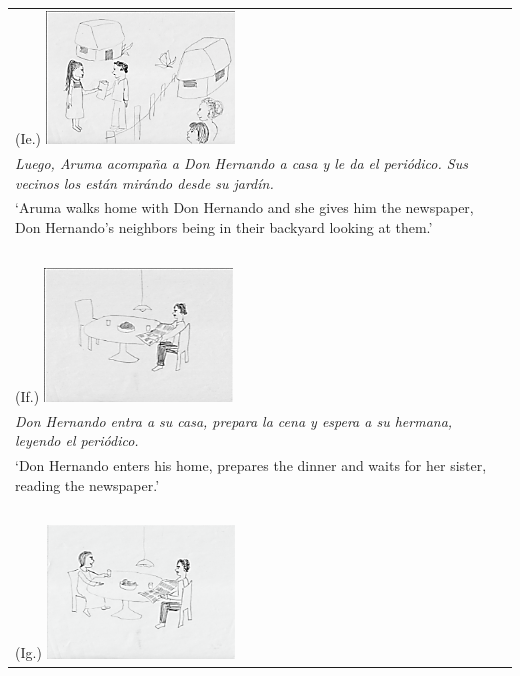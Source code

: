 \documentclass[output=paper]{langsci/langscibook}
\begin{document}
\begin{table}
\begin{tabularx}{\textwidth}{p{5cm}p{6cm}}
\begin{minipage}[t]{5cm}(Ie.)
\includegraphics[width=5cm]{figures/UTH-img11.png}
\end{minipage}& \begin{minipage}[t]{6cm}
\ \\
\textit{Luego, Aruma acompaña a Don Hernando a casa y le da el periódico. Sus vecinos los están mirándo desde su jardín.}\\
{‘Aruma walks home with Don Hernando and she gives him the newspaper, Don Hernando’s neighbors being in their backyard looking at them.’}
\end{minipage}\\
\ \\
\begin{minipage}[t]{5cm}(If.)
\includegraphics[width=5cm]{figures/UTH-img12.png}
\end{minipage}& \begin{minipage}[t]{6cm}
\ \\
\textit{Don Hernando entra a su casa, prepara la cena y espera a su hermana, leyendo el periódico.}\\
{‘Don Hernando enters his home, prepares the dinner and waits for her sister, reading the newspaper.’}
\end{minipage}\\
\ \\
\begin{minipage}[t]{5cm}(Ig.)
\includegraphics[width=5cm]{figures/UTH-img13.png}

\end{minipage}
\end{tabularx}
\end{table}
\end{document}
